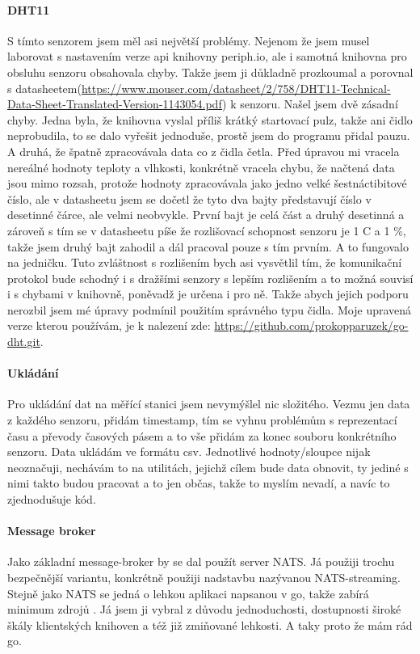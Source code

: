 \paragraph*{DHT11}
S tímto senzorem jsem měl asi největší problémy. Nejenom že jsem musel laborovat s nastavením verze api knihovny 
periph.io, ale i samotná knihovna pro obsluhu senzoru obsahovala chyby. Takže jsem ji důkladně prozkoumal a porovnal 
s datasheetem(\url{https://www.mouser.com/datasheet/2/758/DHT11-Technical-Data-Sheet-Translated-Version-1143054.pdf}) 
k senzoru. Našel jsem dvě zásadní chyby. Jedna byla, že knihovna vyslal příliš krátký startovací pulz, takže ani čidlo 
neprobudila, to se dalo vyřešit jednoduše, prostě jsem do programu přidal pauzu. A druhá, že špatně zpracovávala data co 
z čidla četla. Před úpravou mi vracela nereálné hodnoty teploty a vlhkosti, konkrétně vracela chybu, že načtená data 
jsou mimo rozsah, protože hodnoty zpracovávala jako jedno velké šestnáctibitové číslo, ale v datasheetu jsem se dočetl 
že tyto dva bajty představují číslo v desetinné čárce, ale velmi neobvykle. První bajt je celá část a druhý desetinná 
a zároveň s tím se v datasheetu píše že rozlišovací schopnost senzoru je 1 \textdegree C a 1 \%, takže jsem druhý bajt 
zahodil a dál pracoval pouze s tím prvním. A to fungovalo na jedničku. Tuto zvláštnost s rozlišením bych asi vysvětlil 
tím, že komunikační protokol bude schodný i s dražšími senzory s lepším rozlišením a to možná souvisí i s chybami 
v knihovně, poněvadž je určena i pro ně. Takže abych jejich podporu nerozbil jsem mé úpravy podmínil použitím správného 
typu čidla. Moje upravená verze kterou používám, je k nalezení zde: \url{https://github.com/prokopparuzek/go-dht.git}.

\paragraph*{Ukládání}
Pro ukládání dat na měřící stanici jsem nevymýšlel nic složitého. Vezmu jen data z každého senzoru, přidám 
\gls{timestamp}, tím se vyhnu problémům s reprezentací času a převody časových pásem a to vše přidám za konec souboru 
konkrétního senzoru. Data ukládám ve formátu \acrshort{csv}. Jednotlivé hodnoty/sloupce nijak neoznačuji, nechávám to na 
utilitách, jejichž cílem bude data obnovit, ty jediné s nimi takto budou pracovat a to jen občas, takže to myslím 
nevadí, a navíc to zjednodušuje kód.

\paragraph*{Message broker}
Jako základní \gls{message-broker} by se dal použít server NATS. Já použiji trochu bezpečnější variantu, konkrétně 
použiji nadstavbu nazývanou NATS-streaming. Stejně jako NATS se jedná o lehkou aplikaci napsanou v go, takže zabírá 
minimum zdrojů \parencite{root.cz:NATS-streaming}. Já jsem ji vybral z důvodu jednoduchosti, dostupnosti široké škály 
klientských knihoven a též již zmiňované lehkosti. A taky proto že mám rád go.

